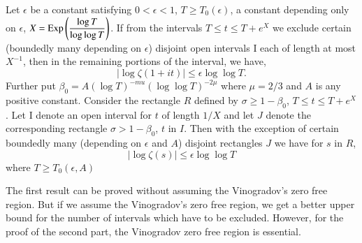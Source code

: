 \begin{theorem}\label{art2-thm7}
Let $\epsilon$ be a constant satisfying $0 < \epsilon <1 $, $T \geqslant T_0 (\epsilon)$, a constant depending only on $\epsilon$, $X = \operatorname{Exp} \left(\dfrac{\log T}{\log \log T} \right)$. If from the intervals $T \leqslant t \leqslant T + e^X$ we exclude certain (boundedly many depending on $\epsilon$) disjoint open intervals I each of length at most $X^{-1}$, then in the remaining portions of the interval, we have,
$$
|\log \zeta (1+ it)| \leqslant \epsilon \log \log T.
$$
Further put $\beta_0 = A(\log T)^{-mu} (\log\log T)^{-2\mu}$ where $\mu = 2/3$ and $A$ is any positive constant. Consider the rectangle $R$ defined by $\sigma \geqslant 1 - \beta_0$, $T \leqslant t \leqslant T + e^X$. Let I denote an open interval for $t$ of length $1/X$ and let $J$ denote the corresponding rectangle $\sigma > 1-\beta_0$, $t$ in $I$. Then with the exception of certain boundedly many (depending on $\epsilon$ and $A$) disjoint rectangles $J$ we have for $s$ in $R$,
$$
|\log \zeta (s)| \leqslant \epsilon \log \log T
$$
where $T \geqslant T_0 (\epsilon, A)$
\end{theorem}

\begin{remark*}
The first result can be proved without assuming the Vinogradov's zero free region. But if we assume the Vinogradov's zero free region, we get a better upper bound for the number of intervals which have to be excluded. However, for the proof of the second part, the Vinogradov zero free region is essential.
\end{remark*}

